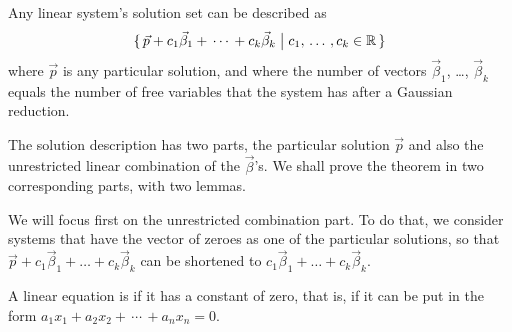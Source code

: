 \begin{theorem} \label{th:GenEqPartPlusHomo}
Any linear system's 
solution set can be described as 
\begin{equation*}
   \mbox{$\{\,\vec{p}+c_1\vec{\beta}_1+\,\cdots\,+c_k\vec{\beta}_k
     \bigm| c_1,\,\ldots\,,c_k\in\mathbb{R}\,\}$}
\end{equation*}
where \( \vec{p} \) is any particular solution,  
and where the number of vectors 
$\vec{\beta}_1$, \ldots, $\vec{\beta}_k$ equals
the number of free variables that the system has after a Gaussian reduction.
\end{theorem}

The solution description has two parts, 
the particular solution $\vec{p}$ 
and also the unrestricted linear combination of the $\vec{\beta}$'s.
We shall prove the theorem in two corresponding parts, with two lemmas.

We will focus first on the unrestricted combination part.
To do that, we consider systems that have the vector of zeroes
as one of the particular solutions, 
so that $\vec{p}+c_1\vec{\beta}_1+\dots+c_k\vec{\beta}_k$
can be shortened to $c_1\vec{\beta}_1+\dots+c_k\vec{\beta}_k$.

\begin{definition}
A linear equation is %
 if it has a constant of zero, that is,
if it can be put in the form $a_1x_1+a_2x_2+\,\cdots\,+a_nx_n=0$.
\end{definition}



